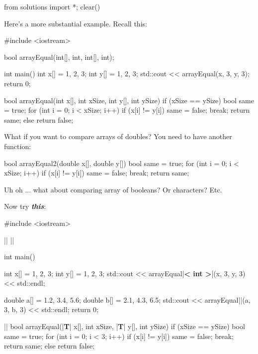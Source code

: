 \begin{python0}
from solutions import *; clear()
\end{python0}

Here's a more substantial example. Recall this:

\begin{consolethree}[escapeinside=||]
#include <iostream>

bool arrayEqual(int[], int, int[], int);

int main()
{
    int x[] = {1, 2, 3};
    int y[] = {1, 2, 3};
    std::cout << arrayEqual(x, 3, y, 3);
    return 0;
}

bool arrayEqual(int x[], int xSize, int y[], int ySize)
{
    if (xSize == ySize)
    {
        bool same = true;
        for (int i = 0; i < xSize; i++)
        {
            if (x[i] != y[i])
            {
                same = false;
                break;
            }
        }
        return same;
    }
    else
    {
        return false;
    }
}
\end{consolethree}

What if you want to compare arrays of doubles? You need to have another
function:

\begin{consolethree}[escapeinside=||]
bool arrayEqual2(double x[], double y[])
{
    bool same = true;
    for (int i = 0; i < xSize; i++)
    {
        if (x[i] != y[i])
        {
            same = false;
            break;
        }
    }
    return same;
}
\end{consolethree}

Uh oh ... what about comparing array of booleans? Or characters? Etc.

Now try \textbf{\textit{this}}:

\begin{consolethree}[escapeinside=||]
#include <iostream>

||
||

int main()
{
    int x[] = {1, 2, 3};
    int y[] = {1, 2, 3};
    std::cout << arrayEqual|\textbf{< int >}|(x, 3, y, 3)
              << std::endl;

    double a[] = {1.2, 3.4, 5.6};
    double b[] = {2.1, 4.3, 6.5};
    std::cout << arrayEqual||(a, 3, b, 3)
              << std::endl;
    return 0;
}

||
bool arrayEqual(|\textbf{T}| x[], int xSize, |\textbf{T}| y[], int ySize)
{
    if (xSize == ySize)
    {
        bool same = true;
        for (int i = 0; i < 3; i++)
        {
            if (x[i] != y[i])
            {
                same = false;
                break;
            }
        }
        return same;
    }
    else
    {
        return false;
    }
}
\end{consolethree}

